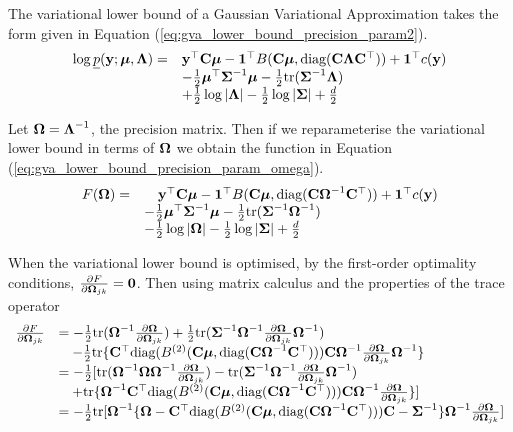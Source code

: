The variational lower bound of a Gaussian Variational Approximation takes the form given in Equation
(\ref{eq:gva_lower_bound_precision_param2}).
\begin{equation}
\label{eq:gva_lower_bound_precision_param2}
\begin{array}{ll}
\log \underline{p}({\bf y}; {\boldsymbol \mu}, {\boldsymbol \Lambda}) =& {\bf y}^\top {\bf C} {\boldsymbol\mu} - {\bf 1}^\top B({\bf C} {\boldsymbol \mu}, \text{diag}({\bf C} {\boldsymbol \Lambda} {\bf C}^\top)) + {\bf 1}^\top c({\bf y}) \\
&- \tfrac{1}{2} {\boldsymbol \mu}^\top {\boldsymbol\Sigma}^{-1} {\boldsymbol \mu} - \tfrac{1}{2} \text{tr}({\boldsymbol \Sigma}^{-1} {\boldsymbol \Lambda}) \\
&+ \tfrac{1}{2} \log |{\boldsymbol \Lambda}| - \tfrac{1}{2} \log |{\boldsymbol \Sigma}| + \tfrac{d}{2}
\end{array}
\end{equation}

Let ${\boldsymbol \Omega} = {\boldsymbol \Lambda}^{-1}$, the precision matrix. Then if we reparameterise the variational lower bound in
terms of ${\boldsymbol \Omega}$ we obtain the function in Equation (\ref{eq:gva_lower_bound_precision_param_omega}).
\begin{equation}
\label{eq:gva_lower_bound_precision_param_omega}
\begin{array}{ll}
F({\boldsymbol \Omega}) =& \quad {\bf y}^\top {\bf C} {\boldsymbol\mu} - {\bf 1}^\top B({\bf C} {\boldsymbol \mu}, \text{diag}({\bf C} {\boldsymbol \Omega}^{-1} {\bf C}^\top)) + {\bf 1}^\top c({\bf y}) \\
&- \tfrac{1}{2} {\boldsymbol \mu}^\top {\boldsymbol\Sigma}^{-1} {\boldsymbol \mu} - \tfrac{1}{2} \text{tr}({\boldsymbol \Sigma}^{-1} {\boldsymbol \Omega}^{-1}) \\
&- \tfrac{1}{2} \log |{\boldsymbol \Omega}| - \tfrac{1}{2} \log |{\boldsymbol \Sigma}| + \tfrac{d}{2}
\end{array}
\end{equation}

When the variational lower bound is optimised, by the first-order optimality conditions, $\tfrac{\partial
F}{\partial {\boldsymbol\Omega}_{jk}} = {\bf 0}$. Then using matrix calculus and the properties of the trace operator
\begin{equation*}
\begin{array}{ll}
\tfrac{\partial F}{\partial {\boldsymbol\Omega}_{jk}} &= -\tfrac{1}{2} \text{tr}({\boldsymbol \Omega}^{-1} \tfrac{\partial {\boldsymbol\Omega}}{\partial {\boldsymbol\Omega}_{jk}}) + \tfrac{1}{2} \text{tr}({\boldsymbol \Sigma}^{-1} {\boldsymbol \Omega}^{-1} \tfrac{\partial {\boldsymbol\Omega}}{\partial {\boldsymbol\Omega}_{jk}} {\boldsymbol \Omega}^{-1}) \\
&\quad -\tfrac{1}{2} \text{tr}\{{\bf C}^\top \text{diag}(B^{(2)}({\bf C} {\boldsymbol \mu}, \text{diag}({\bf C} {\boldsymbol \Omega}^{-1} {\bf C}^\top))) {\bf C} {\boldsymbol \Omega}^{-1} \tfrac{\partial {\boldsymbol\Omega}}{\partial {\boldsymbol\Omega}_{jk}} {\boldsymbol \Omega}^{-1}\} \\
&=-\tfrac{1}{2} [ \text{tr}({\boldsymbol \Omega}^{-1} {\boldsymbol \Omega} {\boldsymbol \Omega}^{-1} \tfrac{\partial {\boldsymbol\Omega}}{\partial {\boldsymbol\Omega}_{jk}}) - \text{tr}({\boldsymbol \Sigma}^{-1} {\boldsymbol \Omega}^{-1} \tfrac{\partial {\boldsymbol\Omega}}{\partial {\boldsymbol\Omega}_{jk}} {\boldsymbol \Omega}^{-1}) \\
&\quad + \text{tr}\{{\boldsymbol \Omega}^{-1} {\bf C}^\top \text{diag}(B^{(2)}({\bf C} {\boldsymbol \mu}, \text{diag}({\bf C} {\boldsymbol \Omega}^{-1} {\bf C}^\top))) {\bf C} {\boldsymbol \Omega}^{-1} \tfrac{\partial {\boldsymbol\Omega}}{\partial {\boldsymbol\Omega}_{jk}}\} ] \\
&= -\tfrac{1}{2} \text{tr}[{\boldsymbol \Omega}^{-1}\{ {\boldsymbol \Omega} - {\bf C}^\top \text{diag}(B^{(2)}({\bf C} {\boldsymbol \mu}, \text{diag}({\bf C} {\boldsymbol \Omega}^{-1} {\bf C}^\top))) {\bf C} - {\boldsymbol \Sigma}^{-1} \} {\boldsymbol \Omega}^{-1} \tfrac{\partial {\boldsymbol\Omega}}{\partial {\boldsymbol\Omega}_{jk}}]
\end{array}
\end{equation*}

